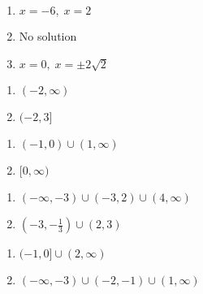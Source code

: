 \begin{multicols}{3}
\begin{enumerate}
\setcounter{enumi}{\value{HW}}

\item $x = -6, \; x = 2$
\item No solution
\item $x = 0, \; x = \pm 2\sqrt{2}$

\setcounter{HW}{\value{enumi}}
\end{enumerate}
\end{multicols}

\begin{multicols}{2}
\begin{enumerate}
\setcounter{enumi}{\value{HW}}

\item $(-2, \infty)$
\item $(-2, 3]$

\setcounter{HW}{\value{enumi}}
\end{enumerate}
\end{multicols}

\begin{multicols}{2}
\begin{enumerate}
\setcounter{enumi}{\value{HW}}


\item $(-1, 0) \cup (1, \infty)$
\item $[0, \infty)$

\setcounter{HW}{\value{enumi}}
\end{enumerate}
\end{multicols}

\begin{multicols}{2}
\begin{enumerate}
\setcounter{enumi}{\value{HW}}

\item $(-\infty, -3) \cup (-3,2) \cup (4, \infty)$
\item $\left(-3, -\frac{1}{3} \right) \cup (2,3)$

\setcounter{HW}{\value{enumi}}
\end{enumerate}
\end{multicols}

\begin{multicols}{2}
\begin{enumerate}
\setcounter{enumi}{\value{HW}}

\item $(-1,0] \cup (2, \infty)$
\item $(-\infty, -3) \cup (-2, -1) \cup (1, \infty)$

\setcounter{HW}{\value{enumi}}
\end{enumerate}
\end{multicols}


